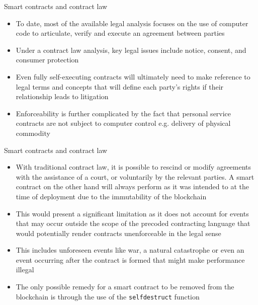 \documentclass[10pt]{beamer}
\begin{document}

\begin{frame}{Smart contracts and contract law}
	\begin{itemize}
		\item To date, most of the available legal analysis focuses on the use of computer code to articulate, verify and execute an agreement between parties
		\item Under a contract law analysis, key legal issues include notice, consent, and consumer protection
		\item Even fully self-executing contracts will ultimately need to make reference to legal terms and concepts that will define each party's rights if their relationship leads to litigation
		\item Enforceability is further complicated by the fact that personal service contracts are not subject to computer control e.g. delivery of physical commodity
	\end{itemize}
\end{frame}


\begin{frame}{Smart contracts and contract law}
	\begin{itemize}
		\item With traditional contract law, it is possible to rescind or modify agreements with the assistance of a court, or voluntarily by the relevant parties. A smart contract on the other hand will always perform as it was intended to at the time of deployment due to the immutability of the blockchain
		\item This would present a significant limitation as it does not account for events that may occur outside the scope of the precoded contracting language that would potentially render contracts unenforceable in the legal sense
		\item This includes unforeseen events like war, a natural catastrophe or even an event occurring after the contract is formed that might make performance illegal
		\item The only possible remedy for a smart contract to be removed from the blockchain is through the use of the \texttt{selfdestruct} function
	\end{itemize}
\end{frame}

\end{document}
